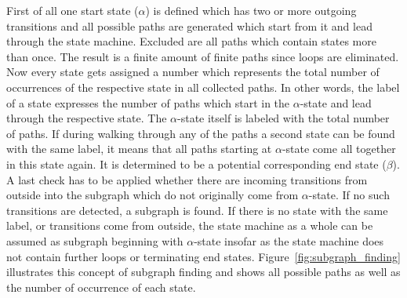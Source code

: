 First of all one start state ($\alpha$) is defined which has two or more outgoing transitions and all possible paths are generated which start from it and lead through the state machine. Excluded are all paths which contain states more than once.
The result is a finite amount of finite paths since loops are eliminated. Now every state gets assigned a number which represents the total number of occurrences of the respective state in all collected paths. In other words, the label of a state expresses the number of paths which start in the $\alpha$-state and lead through the respective state. The $\alpha$-state itself is labeled with the total number of paths. If during walking through any of the paths a second state can be found with the same label, it means that all paths starting at $\alpha$-state come all together in this state again. It is determined to be a potential corresponding end state ($\beta$).
A last check has to be applied whether there are incoming transitions from outside into the subgraph which do not originally come from $\alpha$-state. If no such transitions are detected, a subgraph is found.
If there is no state with the same label, or transitions come from outside, the state machine as a whole can be assumed as subgraph beginning with $\alpha$-state insofar as the state machine does not contain further loops or terminating end states. Figure~\ref{fig:subgraph_finding} illustrates this concept of subgraph finding and shows all possible paths as well as the number of occurrence of each state.
